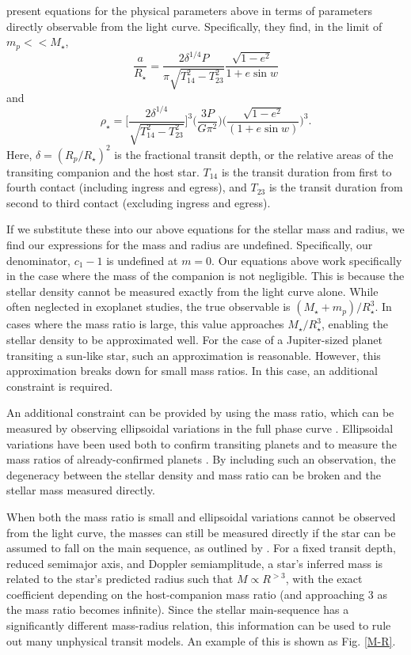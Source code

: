 \citet{Dawson12a} present equations for the physical parameters above in terms of parameters directly observable from the light curve. 
Specifically, they find, in the limit of $m_p << M_\star$,
\begin{equation}
\frac{a}{R_\star} = \frac{2 \delta^{1/4} P}{\pi \sqrt{T^2_{14} - T^2_{23}}} \frac{\sqrt{1-e^2}}{1+e \sin w} 
\end{equation}
and
\begin{equation}
\rho_\star = \bigg[\frac{2 \delta^{1/4}}{ \sqrt{T^2_{14} - T^2_{23}}}\bigg]^3 \bigg(\frac{3P}{G\pi^2}\bigg)\bigg(\frac{\sqrt{1-e^2}}{(1+e \sin w)}\bigg)^3.
\end{equation}
Here, $\delta = (R_p / R_\star)^2$ is the fractional transit depth, or the relative areas of the transiting companion and the host star. 
$T_{14}$ is the transit duration from first to fourth contact (including ingress and egress), and $T_{23}$ is the transit duration from second to third contact (excluding ingress and egress).
 
If we substitute these into our above equations for the stellar mass and radius, we find our expressions for the mass and radius are undefined. 
Specifically, our denominator, $c_1 - 1$ is undefined at $m = 0$. 
Our equations above work specifically in the case where the mass of the companion is not negligible. 
This is because the stellar density cannot be measured exactly from the light curve alone.
While often neglected in exoplanet studies, the true observable is $(M_\star + m_p)/R_\star^3$. 
In cases where the mass ratio is large, this value approaches $M_\star / R_\star^3$, enabling the stellar density to be approximated well.
For the case of a Jupiter-sized planet transiting a sun-like star, such an approximation is reasonable.
However, this approximation breaks down for small mass ratios.
In this case, an additional constraint is required.

An additional constraint can be provided by using the mass ratio, which can be measured by observing ellipsoidal variations in the full phase curve \citep{Loeb03}. 
Ellipsoidal variations have been used both to confirm transiting planets \citep[e.g.][]{Mislis12} and to measure the mass ratios of already-confirmed planets \citep[e.g.][]{Welsh10, Jackson12}. 
By including such an observation, the degeneracy between the stellar density and mass ratio can be broken and the stellar mass measured directly.

When both the mass ratio is small and ellipsoidal variations cannot be observed from the light curve, the masses can still be measured directly if the star can be assumed to fall on the main sequence, as outlined by \citet{Seager03}. 
For a fixed transit depth, reduced semimajor axis, and Doppler semiamplitude, a star's inferred mass is related to the star's predicted radius such that $M \propto R^{>3}$, with the exact coefficient depending on the host-companion mass ratio (and approaching 3 as the mass ratio becomes infinite). Since the stellar main-sequence has a significantly different mass-radius relation, this information can be used to rule out many unphysical transit models. An example of this is shown as Fig. \ref{M-R}.

